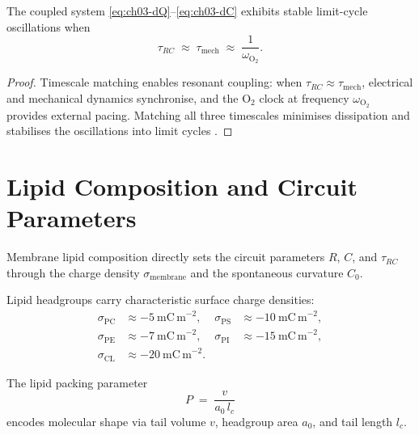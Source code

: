 \begin{theorem}
\label{thm:ch03-stability}
The coupled system \eqref{eq:ch03-dQ}--\eqref{eq:ch03-dC} exhibits stable
limit-cycle oscillations when
\begin{equation}
    \tau_{RC} \;\approx\; \tau_\mathrm{mech} \;\approx\; \frac{1}{\omega_{\mathrm{O}_2}}.
    \label{eq:ch03-timescale-match}
\end{equation}
\end{theorem}

\begin{proof}
Timescale matching enables resonant coupling: when $\tau_{RC}\approx\tau_\mathrm{mech}$,
electrical and mechanical dynamics synchronise, and the O$_2$ clock at frequency
$\omega_{\mathrm{O}_2}$ provides external pacing.  Matching all three timescales
minimises dissipation and stabilises the oscillations into limit cycles
\citep{Kuramoto1984}.
\end{proof}

\section{Lipid Composition and Circuit Parameters}
\label{sec:ch03-lipid-circuit}

Membrane lipid composition directly sets the circuit parameters $R$, $C$, and
$\tau_{RC}$ through the charge density $\sigma_\mathrm{membrane}$ and the
spontaneous curvature $C_0$.

\begin{definition}
\label{def:ch03-lipid-charge}
Lipid headgroups carry characteristic surface charge densities:
\begin{align}
    \sigma_\mathrm{PC} &\approx -5~\mathrm{mC\,m}^{-2}, &
    \sigma_\mathrm{PS} &\approx -10~\mathrm{mC\,m}^{-2}, \nonumber\\
    \sigma_\mathrm{PE} &\approx -7~\mathrm{mC\,m}^{-2}, &
    \sigma_\mathrm{PI} &\approx -15~\mathrm{mC\,m}^{-2}, \nonumber\\
    \sigma_\mathrm{CL} &\approx -20~\mathrm{mC\,m}^{-2}. &&
    \label{eq:ch03-lipid-charge}
\end{align}
\end{definition}

\begin{definition}
\label{def:ch03-packing}
The lipid packing parameter
\begin{equation}
    P \;=\; \frac{v}{a_0\,l_c}
\end{equation}
encodes molecular shape via tail volume $v$, headgroup area $a_0$, and tail
length $l_c$.
\end{definition}

